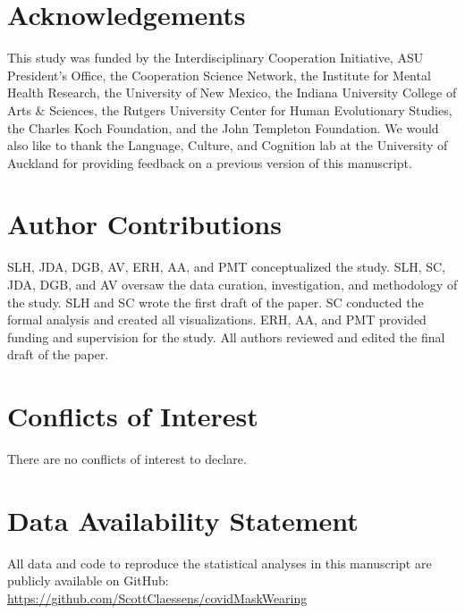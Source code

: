 \documentclass[
  man, donotrepeattitle,floatsintext]{apa6}
\begin{document}
\newpage

\hypertarget{acknowledgements}{%
\section{Acknowledgements}\label{acknowledgements}}

This study was funded by the Interdisciplinary Cooperation Initiative, ASU President's Office, the Cooperation Science Network, the Institute for Mental Health Research, the University of New Mexico, the Indiana University College of Arts \& Sciences, the Rutgers University Center for Human Evolutionary Studies, the Charles Koch Foundation, and the John Templeton Foundation. We would also like to thank the Language, Culture, and Cognition lab at the University of Auckland for providing feedback on a previous version of this manuscript.

\hypertarget{author-contributions}{%
\section{Author Contributions}\label{author-contributions}}

SLH, JDA, DGB, AV, ERH, AA, and PMT conceptualized the study. SLH, SC, JDA, DGB, and AV oversaw the data curation, investigation, and methodology of the study. SLH and SC wrote the first draft of the paper. SC conducted the formal analysis and created all visualizations. ERH, AA, and PMT provided funding and supervision for the study. All authors reviewed and edited the final draft of the paper.

\hypertarget{conflicts-of-interest}{%
\section{Conflicts of Interest}\label{conflicts-of-interest}}

There are no conflicts of interest to declare.

\hypertarget{data-availability-statement}{%
\section{Data Availability Statement}\label{data-availability-statement}}

All data and code to reproduce the statistical analyses in this manuscript are publicly available on GitHub: \url{https://github.com/ScottClaessens/covidMaskWearing}

\newpage
\end{document}
